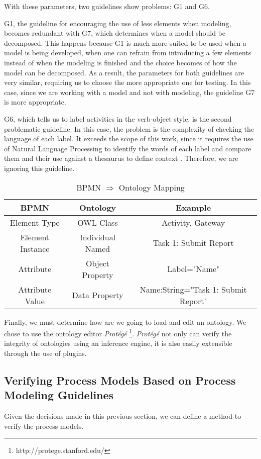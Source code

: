\documentclass[a4paper,twoside]{article}
\begin{document}
With these parameters, two guidelines show problems: G1 and G6.

G1, the guideline for encouraging the use of less elements when modeling, becomes redundant with G7, which determines when a model should be decomposed. This happens because G1 is much more suited to be used when a model is being developed, when one can refrain from introducing a few elements instead of when the modeling is finished and the choice becomes of how the model can be decomposed. As a result, the parameters for both guidelines are very similar, requiring us to choose the more appropriate one for testing. In this case, since we are working with a model and not with modeling, the guideline G7 is more appropriate.

G6, which tells us to label activities in the verb-object style, is the second problematic guideline. In this case, the problem is the complexity of checking the language of each label. It exceeds the scope of this work, since it requires the use of Natural Language Processing to identify the words of each label and compare them and their use against a thesaurus to define context \cite{gassen2014business}. Therefore, we are ignoring this guideline.

\begin{table*}[]
	\label{BPMNOntologyMapping}
	\caption{BPMN $\Rightarrow$ Ontology Mapping}
	\centering
	\begin{tabular}{ccc}
		\hline
		BPMN & Ontology & Example \\
		\hline
		Element Type & OWL Class & Activity, Gateway \\
		Element Instance & Individual Named & Task 1: Submit Report \\  
		Attribute & Object Property & Label="Name" \\
		Attribute Value & Data Property & Name:String="Task 1: Submit Report" \\ 
		\hline
	\end{tabular} 
\end{table*}


Finally, we must determine how are we going to load and edit an ontology. We chose to use the ontology editor \textit{Protégé} \footnote{http://protege.stanford.edu/}. \textit{Protégé} not only can verify the integrity of ontologies using an inference engine, it is also easily extensible through the use of plugins. %

\subsection{Verifying Process Models Based on Process Modeling Guidelines}
Given the decisions made in this previous section, we can define a method to verify the process models.
\end{document}
